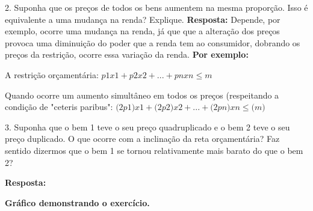 \begin{flushleft}
2. Suponha que os preços de todos os bens aumentem na mesma proporção. Isso é equivalente a uma mudança na renda? Explique.
\singlespacing
\textbf{Resposta:} Depende, por exemplo, ocorre uma mudança na renda, já que que a alteração dos preços provoca uma diminuição do poder que a renda tem ao consumidor, dobrando os preços da restrição, ocorre essa variação da renda. \textbf{Por exemplo:}

\begin{center}

A restrição orçamentária: $\textit{p1x1} + \textit{p2x2} +...+ \textit{pnxn} \leq \textit{m}$ \singlespacing

Quando ocorre um aumento simultâneo em todos os preços (respeitando a condição de "ceteris paribus":  $\textit{(2p1)x1} + \textit{(2p2)x2} +...+ \textit{(2pn)xn} \leq \textit{(m)}$ \singlespacing

\end{center}

 \singlespacing

3. Suponha que o bem 1 teve o seu preço quadruplicado e o bem 2 teve o seu preço duplicado. O que ocorre com a inclinação da reta orçamentária? Faz sentido dizermos que o bem 1 se tornou relativamente mais barato do que o bem 2? \singlespacing

\textbf{Resposta:} 
\\
\begin{center}
\textbf{Gráfico demonstrando o exercício.} 
\singlespacing
{}    
\singlespacing


\end{center}
\end{flushleft}
